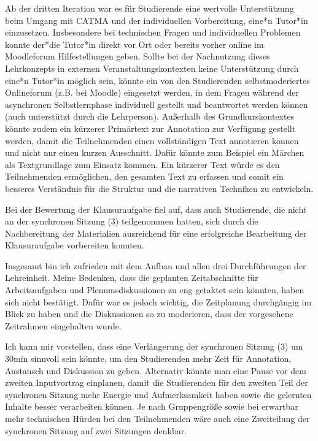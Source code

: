 \documentclass[
          a4paper,
        ]{article}
\begin{document}
Ab der dritten Iteration war es für Studierende eine wertvolle
Unterstützung beim Umgang mit CATMA und der individuellen Vorbereitung,
eine*n Tutor*in einzusetzen. Insbesondere bei technischen Fragen und
individuellen Problemen konnte der*die Tutor*in direkt vor Ort oder
bereits vorher online im Moodleforum Hilfestellungen geben. Sollte bei
der Nachnutzung dieses Lehrkonzepts in externen Veranstaltungskontexten
keine Unterstützung durch eine*n Tutor*in möglich sein, könnte ein von
den Studierenden selbstmoderiertes Onlineforum (z.B. bei Moodle)
eingesetzt werden, in dem Fragen während der asynchronen Selbstlernphase
individuell gestellt und beantwortet werden können (auch unterstützt
durch die Lehrperson). Außerhalb des Grundkurskontextes könnte zudem ein
kürzerer Primärtext zur Annotation zur Verfügung gestellt werden, damit
die Teilnehmenden einen vollständigen Text annotieren können und nicht
nur einen kurzen Ausschnitt. Dafür könnte zum Beispiel ein Märchen als
Textgrundlage zum Einsatz kommen. Ein kürzerer Text würde es den
Teilnehmenden ermöglichen, den gesamten Text zu erfassen und somit ein
besseres Verständnis für die Struktur und die narrativen Techniken zu
entwickeln.

Bei der Bewertung der Klausuraufgabe fiel auf, dass auch Studierende,
die nicht an der synchronen Sitzung (3) teilgenommen hatten, sich durch
die Nachbereitung der Materialien ausreichend für eine erfolgreiche
Bearbeitung der Klausuraufgabe vorbereiten konnten.

Insgesamt bin ich zufrieden mit dem Aufbau und allen drei Durchführungen
der Lehreinheit. Meine Bedenken, dass die geplanten Zeitabschnitte für
Arbeitsaufgaben und Plenumsdiskussionen zu eng getaktet sein könnten,
haben sich nicht bestätigt. Dafür war es jedoch wichtig, die Zeitplanung
durchgängig im Blick zu haben und die Diskussionen so zu moderieren,
dass der vorgesehene Zeitrahmen eingehalten wurde.

Ich kann mir vorstellen, dass eine Verlängerung der synchronen Sitzung
(3) um 30min sinnvoll sein könnte, um den Studierenden mehr Zeit für
Annotation, Austausch und Diskussion zu geben. Alternativ könnte man
eine Pause vor dem zweiten Inputvortrag einplanen, damit die
Studierenden für den zweiten Teil der synchronen Sitzung mehr Energie
und Aufmerksamkeit haben sowie die gelernten Inhalte besser verarbeiten
können. Je nach Gruppengröße sowie bei erwartbar mehr technischen Hürden
bei den Teilnehmenden wäre auch eine Zweiteilung der synchronen Sitzung
auf zwei Sitzungen denkbar.
\end{document}

